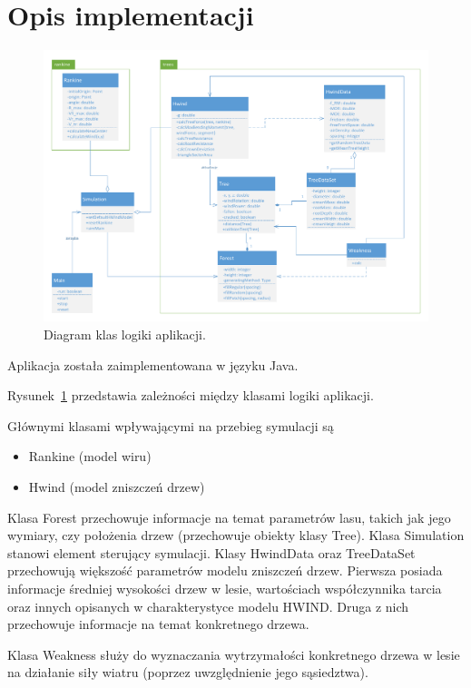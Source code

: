 \section{Opis implementacji}

\begin{figure}[!h]
	\center
	\includegraphics[scale=0.51]{uml}
	\caption{Diagram klas logiki aplikacji.}
	\label{fig:uml1}
\end{figure} 

Aplikacja została zaimplementowana w języku Java. 

Rysunek~\ref{fig:uml1} przedstawia zależności między klasami logiki aplikacji.

Głównymi klasami wpływającymi na przebieg symulacji są 
\begin{itemize}
\item Rankine (model wiru)
\item Hwind (model zniszczeń drzew)
\end{itemize}
Klasa Forest przechowuje informacje na temat parametrów lasu, takich jak jego wymiary, czy położenia drzew (przechowuje obiekty klasy Tree). Klasa Simulation stanowi element sterujący symulacji.
Klasy HwindData oraz TreeDataSet przechowują większość parametrów modelu zniszczeń drzew. Pierwsza posiada informacje średniej wysokości drzew w lesie, wartościach współczynnika tarcia oraz innych opisanych w charakterystyce modelu HWIND.
Druga z nich przechowuje informacje na temat konkretnego drzewa.

Klasa Weakness służy do wyznaczania wytrzymałości konkretnego drzewa w lesie na działanie siły wiatru (poprzez uwzględnienie jego sąsiedztwa).

